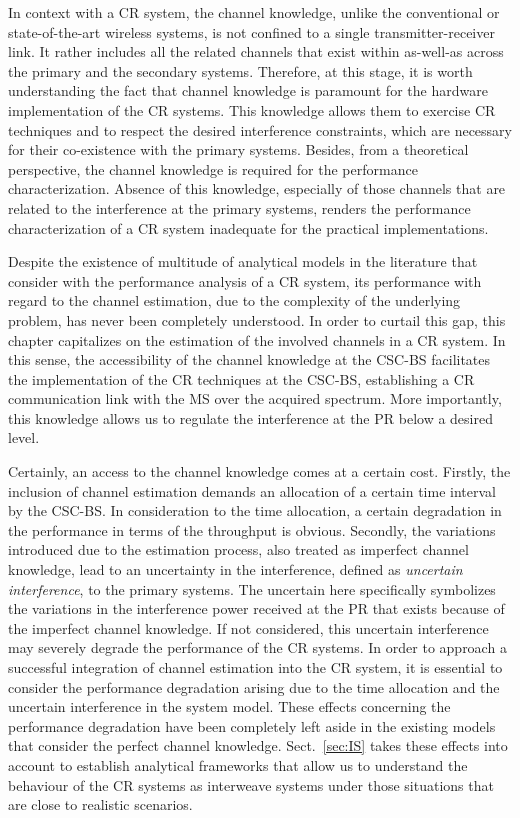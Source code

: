 In context with a CR system, the channel knowledge, unlike the conventional or state-of-the-art wireless systems, is not confined to a single transmitter-receiver link. It rather includes all the related channels that exist within as-well-as across the primary and the secondary systems. Therefore, at this stage, it is worth understanding the fact that channel knowledge is paramount for the hardware implementation of the CR systems. This knowledge allows them to exercise CR techniques and to respect the desired interference constraints, which are necessary for their co-existence with the primary systems. Besides, from a theoretical perspective, the channel knowledge is required for the performance characterization. Absence of this knowledge, especially of those channels that are related to the interference at the primary systems, renders the performance characterization of a CR system inadequate for the practical implementations.


Despite the existence of multitude of analytical models in the literature \cite{Liang08, Sharma14, Ghasemi07} that consider with the performance analysis of a CR system, its performance with regard to the channel estimation, due to the complexity of the underlying problem, has never been completely understood. In order to curtail this gap, this chapter capitalizes on the estimation of the involved channels in a CR system. In this sense, the accessibility of the channel knowledge at the CSC-BS facilitates the implementation of the CR techniques at the CSC-BS, establishing a CR communication link with the MS over the acquired spectrum. More importantly, this knowledge allows us to regulate the interference at the PR below a desired level.

Certainly, an access to the channel knowledge comes at a certain cost. Firstly, the inclusion of channel estimation demands an allocation of a certain time interval by the CSC-BS. In consideration to the time allocation, a certain degradation in the performance in terms of the throughput is obvious. Secondly, the variations introduced due to the estimation process, also treated as imperfect channel knowledge, lead to an uncertainty in the interference, defined as \textit{uncertain interference}, to the primary systems. The uncertain here specifically symbolizes the variations in the interference power received at the PR that exists because of the imperfect channel knowledge. If not considered, this uncertain interference may severely degrade the performance of the CR systems. In order to approach a successful integration of channel estimation into the CR system, it is essential to consider the performance degradation arising due to the time allocation and the uncertain interference in the system model. These effects concerning the performance degradation have been completely left aside in the existing models that consider the perfect channel knowledge. Sect.~\ref{sec:IS} takes these effects into account to establish analytical frameworks that allow us to understand the behaviour of the CR systems as interweave systems under those situations that are close to realistic scenarios. %

